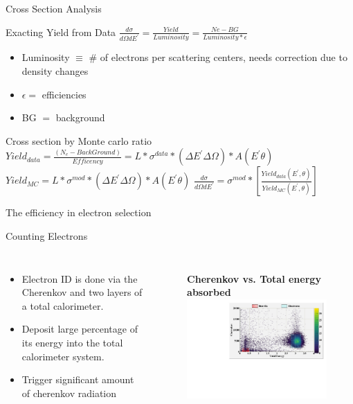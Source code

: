 \documentclass{beamer}
\begin{document}
\begin{frame}{Cross Section Analysis}
	\begin{block}{Exacting Yield from Data}
		\centering
		$\frac{d\sigma}{d\Omega dE^\prime} =  \frac{Yield}{Luminosity} = \frac{Ne - BG }{Luminosity *  \epsilon} $
		\begin{itemize}
			\item Luminosity $\equiv$ \# of electrons per scattering centers, needs correction due to density changes
			\item $\epsilon = $ efficiencies
			\item  BG $ = $ background
		\end{itemize}
	\end{block}	
	\begin{block}{Cross section by Monte carlo ratio}	
		$ Yield_{data} = \frac{\left(N_e - BackGround\right)}{Efficency } =  \textit{L} *\sigma^{data} * \left( \Delta E^\prime \Delta \Omega\right)*  A \left(E^\prime \theta \right)$
		$ Yield_{MC} = \textit{L} *\sigma^{mod} * \left( \Delta E^\prime \Delta \Omega\right)*  A \left(E^\prime \theta \right)$
		\centering $ \frac{d\sigma}{d\Omega dE^\prime} = \sigma^{mod} * \left[\frac{Yield_{data} \left( 
			E^\prime,\theta\right)} {Yield_{MC}\left(E^\prime,\theta\right)}\right] $
	\end{block}	
\end{frame}
\begin{frame}{The efficiency in electron selection}
	\begin{block}{Counting Electrons}
		\begin{columns}
			\begin{itemize}
 		 		\setlength{\parskip}{0pt}
				\setlength{\itemsep}{0pt plus 1pt}
				\item Electron ID is done via the Cherenkov and two layers of a total calorimeter.
				\item Deposit large percentage of its energy into the total calorimeter system.
				\item Trigger significant amount of cherenkov radiation
			\end{itemize}		
			\begin{figure}
					\textbf{Cherenkov vs. Total energy absorbed}
					\includegraphics[width=7.0cm]{../images/PID_2d.pdf}
			\end{figure}
		\end{columns}
	\end{block}
\end{frame}
\end{document}
